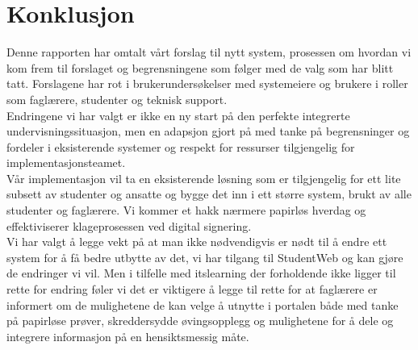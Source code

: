\section{Konklusjon}

Denne rapporten har omtalt vårt forslag til nytt system, prosessen om hvordan vi kom frem til forslaget og begrensningene som følger med de valg som har blitt tatt. Forslagene
har rot i brukerundersøkelser med systemeiere og brukere i roller som faglærere, studenter og teknisk support. \\ 

Endringene vi har valgt er ikke en ny start på den perfekte integrerte
undervisningssituasjon, men en adapsjon gjort på med tanke på begrensninger og fordeler i eksisterende systemer og respekt for ressurser tilgjengelig for implementasjonsteamet. \\
Vår implementasjon vil ta en eksisterende løsning som er tilgjengelig for ett lite subsett av studenter og ansatte og bygge det inn i ett større system, brukt av alle studenter
og faglærere. Vi kommer et hakk nærmere papirløs hverdag og effektiviserer klageprosessen ved digital signering. \\

Vi har valgt å legge vekt på at man ikke nødvendigvis er nødt til å endre ett system for å få bedre utbytte av det, vi har tilgang til StudentWeb og kan gjøre de endringer vi vil.
Men i tilfelle med itslearning der forholdende ikke ligger til rette for endring føler vi det er viktigere å legge til rette for at faglærere er informert om de mulighetene de kan velge å utnytte i portalen både med tanke på papirløse prøver, skreddersydde øvingsopplegg og mulighetene for å dele og integrere informasjon på en hensiktsmessig måte.


